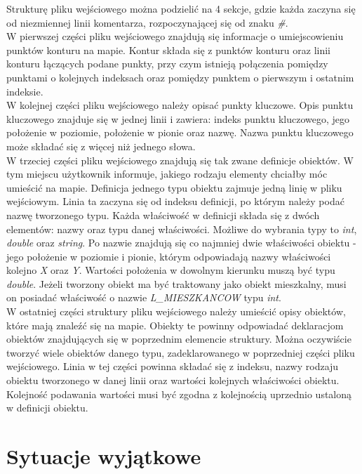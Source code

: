 \documentclass[a4paper,12pt]{article}
\newcommand\tab[1][0.6cm]{\hspace*{#1} }
\begin{document}
Strukturę pliku wejściowego można podzielić na 4 sekcje, gdzie każda zaczyna się od niezmiennej linii komentarza, rozpoczynającej się od znaku \textit{\#}.
\\\tab W pierwszej części pliku wejściowego znajdują się informacje o umiejscowieniu punktów konturu na mapie. Kontur składa się z punktów konturu oraz linii konturu łączących podane punkty, przy czym istnieją połączenia pomiędzy punktami o kolejnych indeksach oraz pomiędzy punktem o pierwszym i ostatnim indeksie.
\\\tab W kolejnej części pliku wejściowego należy opisać punkty kluczowe. Opis punktu kluczowego znajduje się w jednej linii i zawiera: indeks punktu kluczowego, jego położenie w poziomie, położenie w pionie oraz nazwę. Nazwa punktu kluczowego może składać się z więcej niż jednego słowa.
\\\tab W trzeciej części pliku wejściowego znajdują się tak zwane definicje obiektów. W tym miejscu użytkownik informuje, jakiego rodzaju elementy chciałby móc umieścić na mapie. Definicja jednego typu obiektu zajmuje jedną linię w pliku wejściowym. Linia ta zaczyna się od indeksu definicji, po którym należy podać nazwę tworzonego typu. Każda właściwość w definicji składa się z dwóch elementów: nazwy oraz typu danej właściwości. Możliwe do wybrania typy to \textit{int}, \textit{double} oraz \textit{string}. Po nazwie znajdują się co najmniej dwie właściwości obiektu - jego położenie w poziomie i pionie, którym odpowiadają nazwy właściwości kolejno \textit{X} oraz \textit{Y}. Wartości położenia w dowolnym kierunku muszą być typu \textit{double}. Jeżeli tworzony obiekt ma być traktowany jako obiekt mieszkalny, musi on posiadać właściwość o nazwie \textit{L\_MIESZKANCOW} typu \textit{int}.
\\\tab W ostatniej części struktury pliku wejściowego należy umieścić opisy obiektów, które mają znaleźć się na mapie. Obiekty te powinny odpowiadać deklaracjom obiektów znajdujących się w poprzednim elemencie struktury. Można oczywiście tworzyć wiele obiektów danego typu, zadeklarowanego w poprzedniej części pliku wejściowego. Linia w tej części powinna składać się z indeksu, nazwy rodzaju obiektu tworzonego w danej linii oraz wartości kolejnych właściwości obiektu. Kolejność podawania wartości musi być zgodna z kolejnością uprzednio ustaloną w definicji obiektu. 

\section{Sytuacje wyjątkowe}
\end{document}
